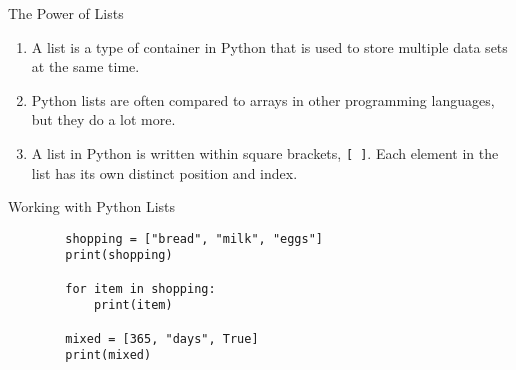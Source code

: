 \documentclass[../main.tex]{subfiles}
\begin{document}
\begin{frame}[fragile]{The Power of Lists}
  \begin{enumerate} \justifying
  \item A list is a type of container in Python that is used to store \alert{multiple data sets at the same time}. 
  \item Python lists are often compared to arrays in other programming languages, but they do a lot more.
  \item A list in Python is written within square brackets, \texttt{[ ]}. Each element in the list has its own distinct position and index. 
  \end{enumerate}

  \begin{exercise}{Working with Python Lists}
      \begin{lstlisting}
        shopping = ["bread", "milk", "eggs"]
        print(shopping)
        
        for item in shopping:
            print(item)

        mixed = [365, "days", True]
        print(mixed)
        
      \end{lstlisting}
  \end{exercise}
\end{frame}
\end{document}
